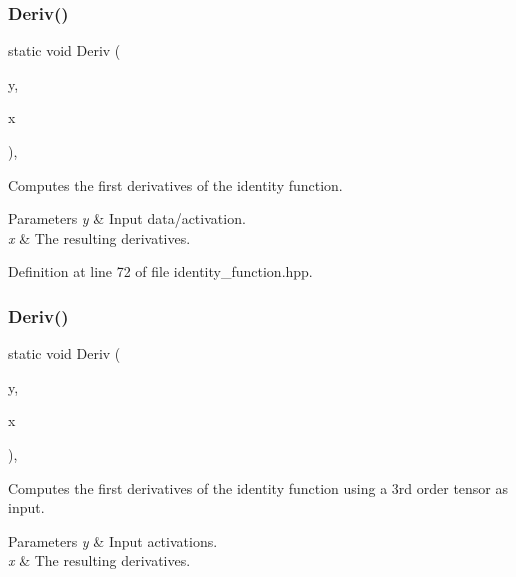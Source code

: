 \subsubsection{Deriv()\hspace{0.1cm}{\footnotesize\ttfamily [2/3]}}
{\footnotesize\ttfamily static void Deriv (\begin{DoxyParamCaption}\item[{const Input\+Vec\+Type \&}]{y,  }\item[{Output\+Vec\+Type \&}]{x }\end{DoxyParamCaption})\hspace{0.3cm}{\ttfamily [inline]}, {\ttfamily [static]}}



Computes the first derivatives of the identity function. 


\begin{DoxyParams}{Parameters}
{\em y} & Input data/activation. \\
\hline
{\em x} & The resulting derivatives. \\
\hline
\end{DoxyParams}


Definition at line 72 of file identity\+\_\+function.\+hpp.

\mbox{\label{classmlpack_1_1ann_1_1IdentityFunction_a81fc1e2d6f4832dd4a564b8d3575f75f}} 
\subsubsection{Deriv()\hspace{0.1cm}{\footnotesize\ttfamily [3/3]}}
{\footnotesize\ttfamily static void Deriv (\begin{DoxyParamCaption}\item[{const arma\+::\+Cube$<$ eT $>$ \&}]{y,  }\item[{arma\+::\+Cube$<$ eT $>$ \&}]{x }\end{DoxyParamCaption})\hspace{0.3cm}{\ttfamily [inline]}, {\ttfamily [static]}}



Computes the first derivatives of the identity function using a 3rd order tensor as input. 


\begin{DoxyParams}{Parameters}
{\em y} & Input activations. \\
\hline
{\em x} & The resulting derivatives. \\
\hline
\end{DoxyParams}


